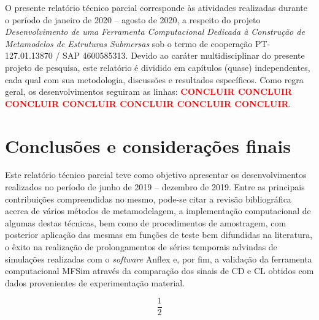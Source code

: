 \documentclass[12pt,fleqn,a4paper]{report}
\begin{document}
		\noindent O presente relatório técnico parcial corresponde às atividades realizadas durante o período de janeiro de 2020 -- agosto de 2020, a respeito do projeto \textit{Desenvolvimento de uma Ferramenta Computacional Dedicada à Construção de Metamodelos de Estruturas Submersas} sob o termo de cooperação PT-127.01.13870 / SAP 4600585313. Devido ao caráter multidisciplinar do presente projeto de pesquisa, este relatório é dividido em capítulos (quase) independentes, cada qual com sua metodologia, discussões e resultados específicos. Como regra geral, os desenvolvimentos seguiram as linhas: \textcolor{red}{\textbf{CONCLUIR CONCLUIR CONCLUIR CONCLUIR CONCLUIR CONCLUIR CONCLUIR}}.
	
	\newpage
	\tableofcontents
	\newpage
	
	
	
	
%	
%	
%   
	
%	
%	
%	

	\chapter{Conclusões e considerações finais}
		\label{finalsec}
		
		Este relatório técnico parcial teve como objetivo apresentar os desenvolvimentos realizados no período de junho de 2019 -- dezembro de 2019. Entre as principais contribuições compreendidas no mesmo, pode-se citar a revisão bibliográfica acerca de vários métodos de metamodelagem, a implementação computacional de algumas destas técnicas, bem como de procedimentos de amostragem, com posterior aplicação das mesmas em funções de teste bem difundidas na literatura, o êxito na realização de prolongamentos de séries temporais advindas de simulações realizadas com o \textit{software} Anflex e, por fim, a validação da ferramenta computacional MFSim através da comparação dos sinais de CD e CL obtidos com dados provenientes de experimentação material.
		
		\begin{equation}
			\frac{1}{2}
		\end{equation}







		
	\begin{singlespace}
		
	\end{singlespace}
\end{document}
